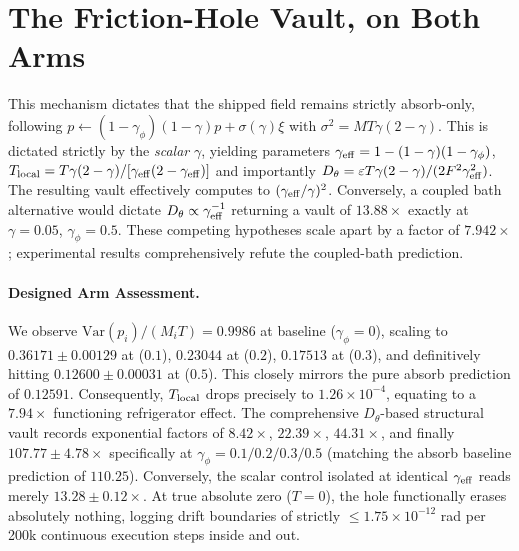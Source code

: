 \documentclass{article}
\begin{document}
\section{The Friction-Hole Vault, on Both Arms}\label{app:vault}

This mechanism dictates that the shipped field remains strictly absorb-only, following $p\leftarrow(1-\gamma_\phi)(1-\gamma)p+\sigma(\gamma)\xi$ with $\sigma^2=MT\gamma(2-\gamma)$. This is dictated strictly by the \emph{scalar} $\gamma$, yielding parameters $\gamma_{\rm eff}=1-(1-\gamma)(1-\gamma_\phi)$, $T_{\rm local}=T\gamma(2-\gamma)/[\gamma_{\rm eff}(2-\gamma_{\rm eff})]$ and importantly $D_\theta=\varepsilon T\gamma(2-\gamma)/(2F^2\gamma_{\rm eff}^2)$. The resulting vault effectively computes to $(\gamma_{\rm eff}/\gamma)^2$. Conversely, a coupled bath alternative would dictate $D_\theta\propto\gamma_{\rm eff}^{-1}$ returning a vault of $13.88\times$ exactly at $\gamma=0.05$, $\gamma_\phi=0.5$. These competing hypotheses scale apart by a factor of $7.942\times$; experimental results comprehensively refute the coupled-bath prediction.

\paragraph{Designed Arm Assessment.} We observe $\mathrm{Var}(p_i)/(M_iT)=0.9986$ at baseline ($\gamma_\phi=0$), scaling to $0.36171\pm0.00129$ at ($0.1$), $0.23044$ at ($0.2$), $0.17513$ at ($0.3$), and definitively hitting $0.12600\pm0.00031$ at ($0.5$). This closely mirrors the pure absorb prediction of $0.12591$. Consequently, $T_{\rm local}$ drops precisely to $1.26\times10^{-4}$, equating to a $7.94\times$ functioning refrigerator effect. The comprehensive $D_\theta$-based structural vault records exponential factors of $8.42\times$, $22.39\times$, $44.31\times$, and finally $107.77\pm4.78\times$ specifically at $\gamma_\phi=0.1/0.2/0.3/0.5$ (matching the absorb baseline prediction of $110.25$). Conversely, the scalar control isolated at identical $\gamma_{\rm eff}$ reads merely $13.28\pm0.12\times$. At true absolute zero ($T=0$), the hole functionally erases absolutely nothing, logging drift boundaries of strictly $\le1.75\times10^{-12}$ rad per 200k continuous execution steps inside and out.
\end{document}
